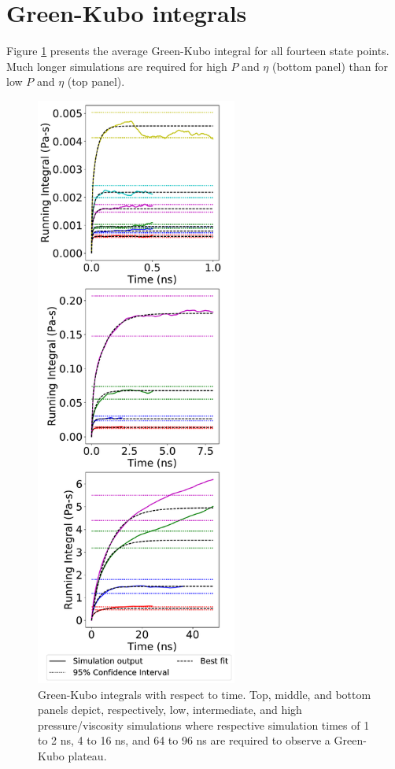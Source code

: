 \documentclass[preprint,review,11pt]{elsarticle}
\begin{document}
\begin{longtable}{|c|c|c|c|c|c|c|c|}
			\end{longtable}
					
	\clearpage
	\newpage
	
	
	\section{Green-Kubo integrals} \label{SI:Running integrals}
		
	Figure \ref{fig:running_integrals} presents the average Green-Kubo integral for all fourteen state points. Much longer simulations are required for high $P$ and $\eta$ (bottom panel) than for low $P$ and $\eta$ (top panel). 	
	
	\begin{figure}[htb!]
		\centering
				\includegraphics[width=2.6in]{GreenKubo_integrals.pdf}
		\caption{Green-Kubo integrals with respect to time. Top, middle, and bottom panels depict, respectively, low, intermediate, and high pressure/viscosity simulations where respective simulation times of 1 to 2 ns, 4 to 16 ns, and 64 to 96 ns are required to observe a Green-Kubo plateau.}
		\label{fig:running_integrals}
	\end{figure}
\end{document}

